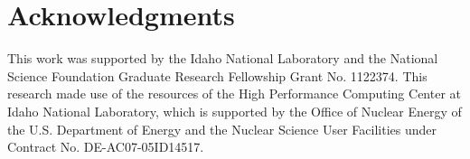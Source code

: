 \section*{Acknowledgments}


This work was supported by the Idaho National Laboratory and the National Science Foundation Graduate Research Fellowship Grant No. 1122374. This research made use of the resources of the High Performance Computing Center at Idaho National Laboratory, which is supported by the Office of Nuclear Energy of the U.S. Department of Energy and the Nuclear Science User Facilities under Contract No. DE-AC07-05ID14517.
